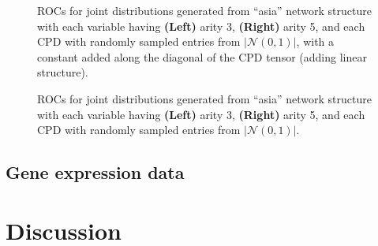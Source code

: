 \documentclass{article} %
\begin{document}
\begin{figure}[h]
\centering
    \quad
\caption{ROCs for joint distributions generated from ``asia'' network structure with each variable having {\bf (Left)} arity 3, {\bf (Right)} arity 5, and each CPD with randomly sampled entries from $|\mathcal{N}(0, 1)|$, with a constant added along the diagonal of the CPD tensor (adding linear structure).}
\label{fig:asia_linear}
\end{figure}


\begin{figure}[h]
\centering
    \quad
\caption{ROCs for joint distributions generated from ``asia'' network structure with each variable having {\bf (Left)} arity 3, {\bf (Right)} arity 5, and each CPD with randomly sampled entries from $|\mathcal{N}(0, 1)|$.}
\label{fig:asia_random}
\end{figure}

\subsection{Gene expression data}

\section{Discussion}

\begin{small}

%
%

\end{small}

%
\end{document}
